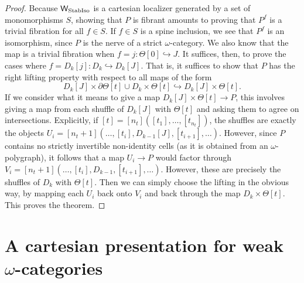 \begin{proof} Because \(\mathsf{W}_{\operatorname{StabIso}}\) is a cartesian localizer generated by a set of monomorphisms \(S\), showing that \(P\) is fibrant amounts to proving that \(P^f\) is a trivial fibration for all \(f \in S\). If \(f\in S\) is a spine inclusion, we see that \(P^f\) is an isomorphism, since \(P\) is the nerve of a strict \(\omega\)-category.  We also know that the map is a trivial fibration when \(f=j:\Theta[0] \hookrightarrow J\).  It suffices, then, to prove the cases where \(f=D_k[j]:D_k\hookrightarrow D_k[J]\).  That is, it suffices to show that \(P\) has the right lifting property with respect to all maps of the form \[D_k[J] \times \partial\Theta[t] \cup D_k \times \Theta[t] \hookrightarrow D_k[J] \times \Theta[t].\]  If we consider what it means to give a map \(D_k[J]\times \Theta[t] \to P\), this involves giving a map from each shuffle of \(D_k[J]\) with \(\Theta[t]\) and asking them to agree on intersections.
Explicitly, if \([t]=[n_t]([t_1],\dots, [t_{n_t}])\), 
the shuffles are exactly the objects 
\(U_i=[n_t+1](\dots, [t_i], D_{k-1}[J],[t_{i+1}],\dots)\).  
However, since \(P\) contains no strictly invertible non-identity cells (as it is obtained from an \(\omega\)-polygraph), it follows that a map \(U_i \to P\) would factor through \(V_i=[n_t+1](\dots, [t_i], D_{k-1},[t_{i+1}],\dots)\).  However, these are precisely the shuffles of 
\(D_{k}\) with \(\Theta[t]\).   Then we can simply choose the lifting in the obvious way, by mapping each \(U_i\) back onto \(V_i\) and back through the map \(D_k\times \Theta[t]\).  This proves the theorem.
\end{proof}
\section{A cartesian presentation for weak $\omega$-categories}

